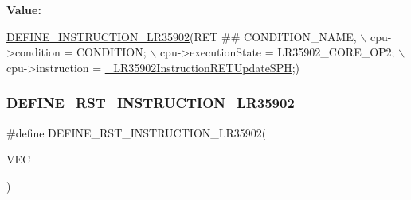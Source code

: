 {\bfseries Value\+:}
\begin{DoxyCode}
\mbox{\hyperlink{isa-lr35902_8c_a3128fc43c5d01e8b51f67901c0b4b5ef}{DEFINE\_INSTRUCTION\_LR35902}}(RET ## CONDITION\_NAME, \(\backslash\)
        cpu->condition = CONDITION; \(\backslash\)
        cpu->executionState = LR35902\_CORE\_OP2; \(\backslash\)
        cpu->instruction = \mbox{\hyperlink{isa-lr35902_8c_adad03232cfc22b6a8b3290d9dfc22823}{\_LR35902InstructionRETUpdateSPH}};)
\end{DoxyCode}
\mbox{\label{isa-lr35902_8c_a6e43808ab3a1f949e5ff1e06fe89ca83}} 
\subsubsection{\texorpdfstring{D\+E\+F\+I\+N\+E\+\_\+\+R\+S\+T\+\_\+\+I\+N\+S\+T\+R\+U\+C\+T\+I\+O\+N\+\_\+\+L\+R35902}{DEFINE\_RST\_INSTRUCTION\_LR35902}}
{\footnotesize\ttfamily \#define D\+E\+F\+I\+N\+E\+\_\+\+R\+S\+T\+\_\+\+I\+N\+S\+T\+R\+U\+C\+T\+I\+O\+N\+\_\+\+L\+R35902(\begin{DoxyParamCaption}\item[{}]{V\+EC }\end{DoxyParamCaption})}

